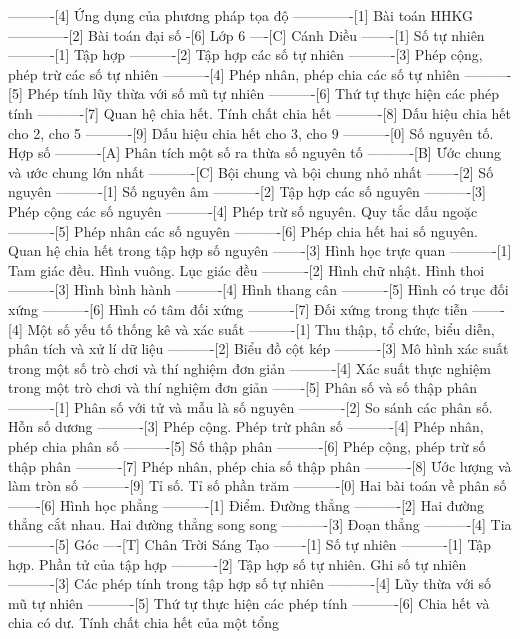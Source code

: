 ----------[4] Ứng dụng của phương pháp tọa độ
-------------[1] Bài toán HHKG
-------------[2] Bài toán đại số
-[6] Lớp 6
----[C] Cánh Diều
-------[1] Số tự nhiên
----------[1] Tập hợp
----------[2] Tập hợp các số tự nhiên
----------[3] Phép cộng, phép trừ các số tự nhiên
----------[4] Phép nhân, phép chia các số tự nhiên
----------[5] Phép tính lũy thừa với số mũ tự nhiên
----------[6] Thứ tự thực hiện các phép tính
----------[7] Quan hệ chia hết. Tính chất chia hết
----------[8] Dấu hiệu chia hết cho 2, cho 5
----------[9] Dấu hiệu chia hết cho 3, cho 9
----------[0] Số nguyên tố. Hợp số
----------[A] Phân tích một số ra thừa số nguyên tố
----------[B] Ước chung và ước chung lớn nhất
----------[C] Bội chung và bội chung nhỏ nhất
-------[2] Số nguyên
----------[1] Số nguyên âm
----------[2] Tập hợp các số nguyên
----------[3] Phép cộng các số nguyên
----------[4] Phép trừ số nguyên. Quy tắc dấu ngoặc
----------[5] Phép nhân các số nguyên
----------[6] Phép chia hết hai số nguyên. Quan hệ chia hết trong tập hợp số nguyên
-------[3] Hình học trực quan
----------[1] Tam giác đều. Hình vuông. Lục giác đều
----------[2] Hình chữ nhật. Hình thoi
----------[3] Hình bình hành
----------[4] Hình thang cân
----------[5] Hình có trục đối xứng
----------[6] Hình có tâm đối xứng
----------[7] Đối xứng trong thực tiễn
-------[4] Một số yếu tố thống kê và xác suất
----------[1] Thu thập, tổ chức, biểu diễn, phân tích và xử lí dữ liệu
----------[2] Biểu đồ cột kép
----------[3] Mô hình xác suất trong một số trò chơi và thí nghiệm đơn giản
----------[4] Xác suất thực nghiệm trong một trò chơi và thí nghiệm đơn giản
-------[5] Phân số và số thập phân
----------[1] Phân số với tử và mẫu là số nguyên
----------[2] So sánh các phân số. Hỗn số dương
----------[3] Phép cộng. Phép trừ phân số
----------[4] Phép nhân, phép chia phân số
----------[5] Số thập phân
----------[6] Phép cộng, phép trừ số thập phân
----------[7] Phép nhân, phép chia số thập phân
----------[8] Ước lượng và làm tròn số
----------[9] Tỉ số. Tỉ số phần trăm
----------[0] Hai bài toán về phân số
-------[6] Hình học phẳng
----------[1] Điểm. Đường thẳng
----------[2] Hai đường thẳng cắt nhau. Hai đường thẳng song song
----------[3] Đoạn thẳng
----------[4] Tia
----------[5] Góc
----[T] Chân Trời Sáng Tạo
-------[1] Số tự nhiên
----------[1] Tập hợp. Phần tử của tập hợp
----------[2] Tập hợp số tự nhiên. Ghi số tự nhiên
----------[3] Các phép tính trong tập hợp số tự nhiên
----------[4] Lũy thừa với số mũ tự nhiên
----------[5] Thứ tự thực hiện các phép tính
----------[6] Chia hết và chia có dư. Tính chất chia hết của một tổng
